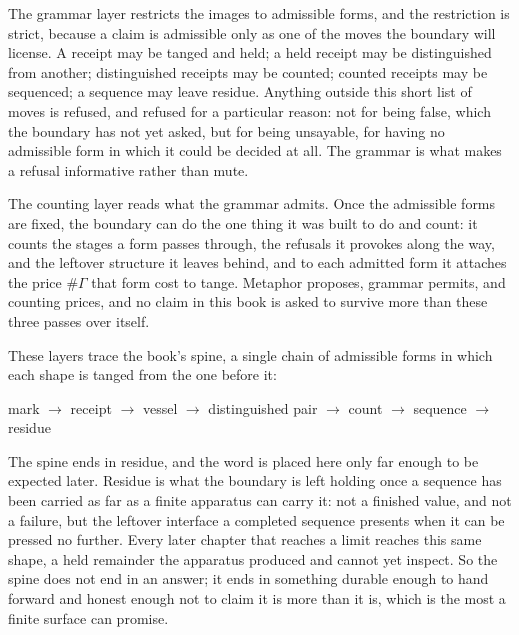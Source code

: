 The grammar layer restricts the images to admissible forms, and the restriction is strict, because a claim is admissible only as one of the moves the boundary will license. A receipt may be tanged and held; a held receipt may be distinguished from another; distinguished receipts may be counted; counted receipts may be sequenced; a sequence may leave residue. Anything outside this short list of moves is refused, and refused for a particular reason: not for being false, which the boundary has not yet asked, but for being unsayable, for having no admissible form in which it could be decided at all. The grammar is what makes a refusal informative rather than mute.

The counting layer reads what the grammar admits. Once the admissible forms are fixed, the boundary can do the one thing it was built to do and count: it counts the stages a form passes through, the refusals it provokes along the way, and the leftover structure it leaves behind, and to each admitted form it attaches the price $\#\Gamma$ that form cost to tange. Metaphor proposes, grammar permits, and counting prices, and no claim in this book is asked to survive more than these three passes over itself.

These layers trace the book's spine, a single chain of admissible forms in which each shape is tanged from the one before it:
\begin{center}
    mark $\rightarrow$ receipt $\rightarrow$ vessel $\rightarrow$ distinguished pair $\rightarrow$ count $\rightarrow$ sequence $\rightarrow$ residue
\end{center}

The spine ends in residue, and the word is placed here only far enough to be expected later. Residue is what the boundary is left holding once a sequence has been carried as far as a finite apparatus can carry it: not a finished value, and not a failure, but the leftover interface a completed sequence presents when it can be pressed no further. Every later chapter that reaches a limit reaches this same shape, a held remainder the apparatus produced and cannot yet inspect. So the spine does not end in an answer; it ends in something durable enough to hand forward and honest enough not to claim it is more than it is, which is the most a finite surface can promise.

